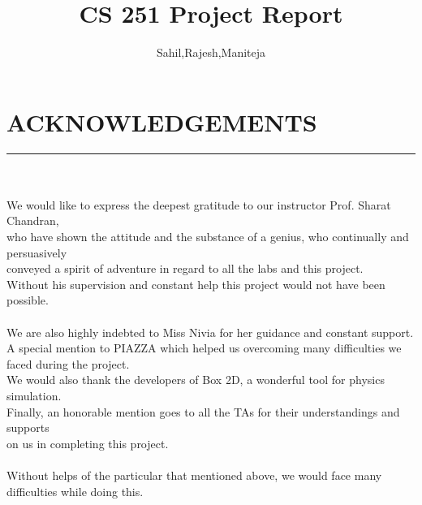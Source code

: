 \documentclass[a4paper, 11pt]{article}
\title{CS 251 Project Report}
\author{Sahil,Rajesh,Maniteja}
\begin{document}
\maketitle
\hfill
\begin{table}[h]
	\begin{center}
	\end{center}
\end{table}
\clearpage
\tableofcontents
\section*{}
\clearpage

\section{\large{ACKNOWLEDGEMENTS}}
\vspace{-17pt}
\noindent\rule{17cm}{0.4pt}\\
\large{
\\
We would like to express the deepest gratitude to our instructor Prof. Sharat Chandran,\\
who have shown the attitude and the substance of a genius, who continually and persuasively \\
conveyed a spirit of adventure in regard to all the labs and this project. \\
Without his supervision and constant help this project  would not have been possible. \\ \\
We are also highly indebted to Miss Nivia for her guidance and constant support.\\ 
A special mention to PIAZZA which helped us overcoming many difficulties we faced during the project.\\
We would also thank the developers of Box 2D, a wonderful tool for physics simulation. \\
Finally, an honorable mention goes to all the TAs  for their
understandings and supports\\ on us in completing this project. \\\\
Without helps of  the particular that mentioned above, we would face many difficulties while doing this.}\\
\clearpage
\end{document}
